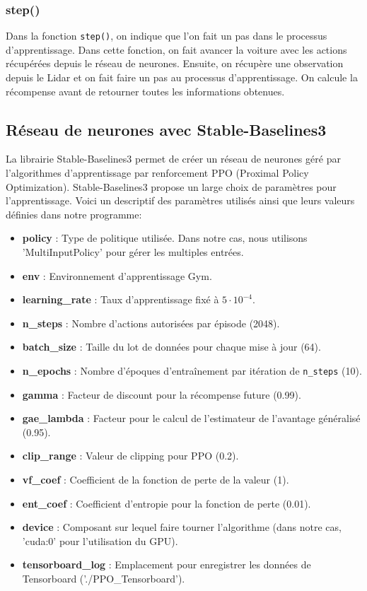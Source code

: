 \documentclass[french]{article}
\begin{document}
\subsubsection*{step()}
Dans la fonction \texttt{step()}, on indique que l'on fait un pas dans le processus d'apprentissage. Dans cette 
fonction, on fait avancer la voiture avec les actions récupérées depuis le réseau de neurones. Ensuite, on récupère 
une observation depuis le Lidar et on fait faire un pas au processus d'apprentissage. On calcule la récompense 
avant de retourner toutes les informations obtenues.

\subsection{Réseau de neurones avec Stable-Baselines3}
La librairie Stable-Baselines3 permet de créer un réseau de neurones géré par l'algorithmes d'apprentissage 
par renforcement PPO (Proximal Policy Optimization). Stable-Baselines3 propose un large choix de paramètres pour 
l'apprentissage. Voici un descriptif des paramètres utilisés ainsi que leurs valeurs définies dans notre programme:
\begin{itemize}
    \item \textbf{policy} : Type de politique utilisée. Dans notre cas, nous utilisons 'MultiInputPolicy' 
    pour gérer les multiples entrées.
    \item \textbf{env} : Environnement d'apprentissage Gym.
    \item \textbf{learning\_rate} : Taux d'apprentissage fixé à $5 \cdot 10^{-4}$.
    \item \textbf{n\_steps} : Nombre d'actions autorisées par épisode (2048).
    \item \textbf{batch\_size} : Taille du lot de données pour chaque mise à jour (64).
    \item \textbf{n\_epochs} : Nombre d'époques d'entraînement par itération de \texttt{n\_steps} (10). 
    \item \textbf{gamma} : Facteur de discount pour la récompense future (0.99).
    \item \textbf{gae\_lambda} : Facteur pour le calcul de l'estimateur de l'avantage généralisé (0.95).
    \item \textbf{clip\_range} : Valeur de clipping pour PPO (0.2).
    \item \textbf{vf\_coef} : Coefficient de la fonction de perte de la valeur (1).
    \item \textbf{ent\_coef} : Coefficient d'entropie pour la fonction de perte (0.01).
    \item \textbf{device} : Composant sur lequel faire tourner l'algorithme (dans notre cas, 'cuda:0' pour l'utilisation du GPU).
    \item \textbf{tensorboard\_log} : Emplacement pour enregistrer les données de Tensorboard ('./PPO\_Tensorboard').
\end{itemize}
\end{document}
